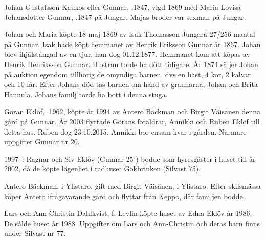 Johan Gustafsson Kaukos eller Gunnar, .1847, vigd 1869 med Maria Lovisa Johansdotter Gunnar, .1847 på Jungar. Majas broder var sexman på Jungar.

\begin{jhchildren}
  \item {}
  \item {}
  \item {}
\end{jhchildren}

Johan och Maria köpte 18 maj 1869 av Isak Thomasson Jungarå 27/256 mantal på Gunnar. Isak hade köpt hemmanet av Henrik
Eriksson Gunnar år 1867. Johan blev ihjälstångad av en tjur, han dog 01.12.1877. Hemmanet kom att köpas av Henrik Henriksson Gunnar. Hustrun torde ha dött tidigare. År 1874 säljer Johan på auktion egendom tillhörig de omyndiga barnen, dvs en häst, 4 kor, 2 kalvar och 10 får. Efter Johans död tas barnen om hand av grannarna, Johan och Brita Hannula. Johans familj torde ha bott i denna stuga.






Göran Eklöf, .1962, köpte år 1994 av Antero Bäckman  och Birgit Väisänen denna gård på Gunnar. År 2003 flyttade Görans föräldrar, Annikki och Ruben Eklöf till detta hus. Ruben dog 23.10.2015. Annikki bor ensam kvar i gården. Närmare uppgifter Gunnar nr 20.

1997--: Ragnar och Siv Eklöv (Gunnar 25 ) bodde som hyresgäster i huset till år 2002, då de köpte lägenhet i radhuset Gökbrinken (Silvast 75).


Antero Bäckman,  i Ylistaro, gift med Birgit Väisänen,  i Ylistaro. Efter skilsmässa köper Antero ifrågavarande gård och flyttar från Keppo, där familjen bodde.

\begin{jhchildren}
  \item {}
  \item {}
\end{jhchildren}


Lars och Ann-Christin Dahlkvist, f. Levlin  köpte huset av Edna Eklöv år 1986. De sålde huset år 1988. Uppgifter om Lars och Ann-Christin och deras barn finns under Silvast nr 77.


